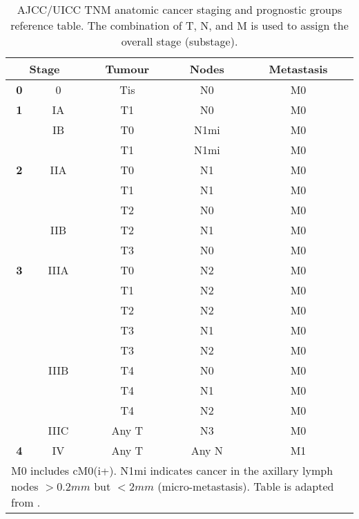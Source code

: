         \begin{table}[!h]
        \centering
        \tiny
        \caption{AJCC/UICC TNM anatomic cancer staging and prognostic groups reference table.  The combination of T, N, and M is used to assign the  overall stage (substage).}
        \label{table:tnmstage}
        \begin{tabular}{c|c|c|c|c}
        \multicolumn{2}{c|}{\textbf{\small Stage}} & \textbf{Tumour} & \textbf{Nodes} & \textbf{Metastasis} \\ \hline
        \textbf{0} & 0 & Tis & N0 & M0 \\ \hline
        \textbf{1} & IA & T1 & N0 & M0 \\ \hline
        \textbf{} & IB & T0 & N1mi & M0 \\ \cline{2-5} 
        \textbf{} &  & T1 & N1mi & M0 \\ \hline
        \textbf{2} & IIA & T0 & N1 & M0 \\ \hline
        \textbf{} &  & T1 & N1 & M0 \\ \cline{2-5} 
        \textbf{} &  & T2 & N0 & M0 \\ \cline{2-5} 
        \textbf{} & IIB & T2 & N1 & M0 \\ \cline{2-5} 
        \textbf{} &  & T3 & N0 & M0 \\ \hline
        \textbf{3} & IIIA & T0 & N2 & M0 \\ \hline
         &  & T1 & N2 & M0 \\ \cline{2-5} 
         &  & T2 & N2 & M0 \\ \cline{2-5} 
         &  & T3 & N1 & M0 \\ \cline{2-5} 
         &  & T3 & N2 & M0 \\ \cline{2-5} 
         & IIIB & T4 & N0 & M0 \\ \cline{2-5} 
         &  & T4 & N1 & M0 \\ \cline{2-5} 
         &  & T4 & N2 & M0 \\ \cline{2-5} 
         & IIIC & Any T & N3 & M0 \\ \hline
        \textbf{4} & IV & Any T & Any N & M1 \\ \hline
        
        \hline
        \multicolumn{5}{l}{%
          \begin{minipage}{5cm}%
            \tiny M0 includes cM0(i+). N1mi indicates cancer in the axillary lymph nodes  $>0.2mm$ but $<2mm$ (micro-metastasis). Table is adapted from \cite{Giuliano2017}. 
          \end{minipage}%
        }\\
        \end{tabular}
        \end{table}


